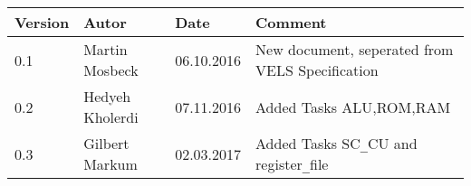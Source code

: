 
\begin{table}[h]
\begin{tabular*}{14.7cm}{|p{}|p{}|p{2cm}|p{}|}
\hline 
Version & Autor & Date & Comment \\[2pt]
\hline
\hline
0.1 & Martin Mosbeck & 06.10.2016& New document, seperated from VELS Specification \\[2pt]
\hline
0.2 & Hedyeh Kholerdi & 07.11.2016& Added Tasks ALU,ROM,RAM \\[2pt]
\hline
0.3 & Gilbert Markum & 02.03.2017 & Added Tasks SC\verb!_!CU and register\verb!_!file \\[2pt]
\hline
\end{tabular*}
\end{table}

